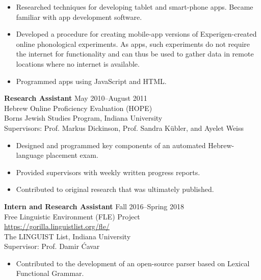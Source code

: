 \begin{singlespace}
\begin{itemize}
\item Researched techniques for developing tablet and smart-phone apps. Became familiar with app development software.
\item Developed a procedure for creating mobile-app versions of Experigen-created online phonological experiments. As apps, such experiments do not require the internet for functionality and can thus be used to gather data in remote locations where no internet is available.
\item Programmed apps using JavaScript and HTML.
\end{itemize}
\vspace{10pt}
\thispagestyle{empty}
\noindent\textbf{Research Assistant} \hfill May 2010--August 2011 \\
Hebrew Online Proficiency Evaluation (HOPE) \\
Borns Jewish Studies Program, Indiana University  \\
Supervisors: Prof. Markus Dickinson, Prof. Sandra K\"ubler, and Ayelet Weiss
\begin{itemize} %
\item Designed and programmed key components of an automated Hebrew-language placement exam. 
\item Provided supervisors with weekly written progress reports.
\item Contributed to original research that was ultimately published.
\end{itemize}
\vspace{10pt}
\noindent\textbf{Intern and Research Assistant} \hfill Fall 2016--Spring 2018 \\
Free Linguistic Environment (FLE) Project \\
\url{https://gorilla.linguistlist.org/fle/} \\
The LINGUIST List, Indiana University \\
Supervisor: Prof. Damir \'Cavar
\begin{itemize} %
\item Contributed to the development of an open-source parser based on Lexical Functional Grammar. %

\end{itemize}
\end{singlespace}
